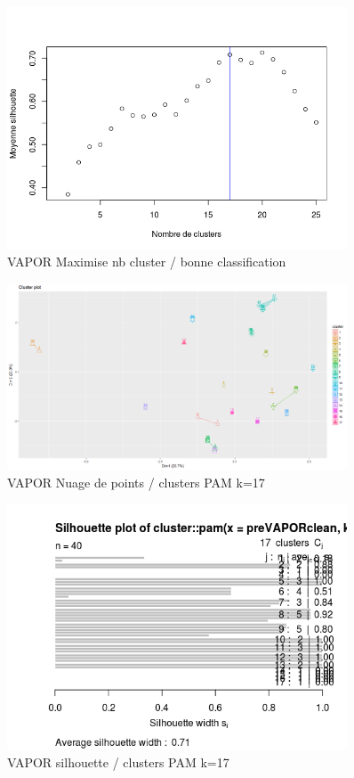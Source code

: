 %
%

\begin{figure}[H]
\centering
\includegraphics[width=0.90\textwidth]{../Fig/VAPOR/vapor-elbow-pre.png}
\caption{VAPOR Maximise nb cluster / bonne classification}
\end{figure}

\begin{figure}[H]
\centering
\includegraphics[width=0.90\textwidth]{../Fig/VAPOR/vapor-pam-k17.png}
\caption{VAPOR Nuage de points / clusters PAM k=17 }
\end{figure}

\begin{figure}[H]
\centering
\includegraphics[width=0.90\textwidth]{../Fig/VAPOR/vapor-sil-pre.png}
\caption{VAPOR silhouette / clusters PAM k=17 }
\end{figure}

